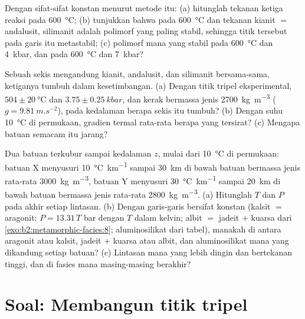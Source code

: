 \begin{exercise}[$\star\star\star$]\label{exo:b2:metamorphic-facies:10}
Dengan sifat-sifat konstan menurut metode itu: (a) hitunglah tekanan ketiga
reaksi pada \qty{600}{\celsius}; (b) tunjukkan bahwa pada \qty{600}{\celsius} dan tekanan
kianit $=$ andalusit, silimanit adalah polimorf yang paling stabil, sehingga titik
tersebut pada garis itu metastabil; (c) polimorf mana yang stabil pada \qty{600}{\celsius} dan
\qty{4}{kbar}, dan pada \qty{600}{\celsius} dan \qty{7}{kbar}?
\end{exercise}

\begin{exercise}[$\star\star\star$]\label{exo:b2:metamorphic-facies:11}
Sebuah sekis mengandung kianit, andalusit, dan silimanit bersama-sama, ketiganya tumbuh dalam
kesetimbangan. (a) Dengan titik tripel eksperimental, $504 \pm \qty{20}{\celsius}$ dan
$3.75 \pm \qty{0.25}{kbar}$, dan kerak bermassa jenis \qty{2700}{kg.m^{-3}} ($g =
\qty{9.81}{m.s^{-2}}$), pada kedalaman berapa sekis itu tumbuh? (b) Dengan suhu \qty{10}{\celsius} di
permukaan, gradien termal rata-rata berapa yang tersirat? (c) Mengapa batuan semacam itu jarang?
\end{exercise}

\begin{exercise}[$\star\star\star$]\label{exo:b2:metamorphic-facies:12}
Dua batuan terkubur sampai kedalaman $z$, mulai dari \qty{10}{\celsius} di permukaan: batuan X menyusuri
\qty{10}{\celsius.km^{-1}} sampai \qty{30}{km} di bawah batuan bermassa jenis rata-rata
\qty{3000}{kg.m^{-3}}, batuan Y menyusuri \qty{30}{\celsius.km^{-1}} sampai \qty{20}{km} di bawah batuan
bermassa jenis rata-rata \qty{2800}{kg.m^{-3}}. (a) Hitunglah $T$ dan $P$ pada akhir setiap lintasan.
(b) Dengan garis-garis bersifat konstan (kalsit $=$ aragonit: $P = 13.31\,T$ bar dengan $T$
dalam kelvin; albit $=$ jadeit + kuarsa dari \cref{exo:b2:metamorphic-facies:8}; aluminosilikat dari
tabel), manakah di antara aragonit atau kalsit, jadeit + kuarsa atau albit, dan
aluminosilikat mana yang dikandung setiap batuan? (c) Lintasan mana yang lebih dingin dan bertekanan tinggi, dan di fasies mana masing-masing berakhir?
\end{exercise}

\section{Soal: Membangun titik tripel}

